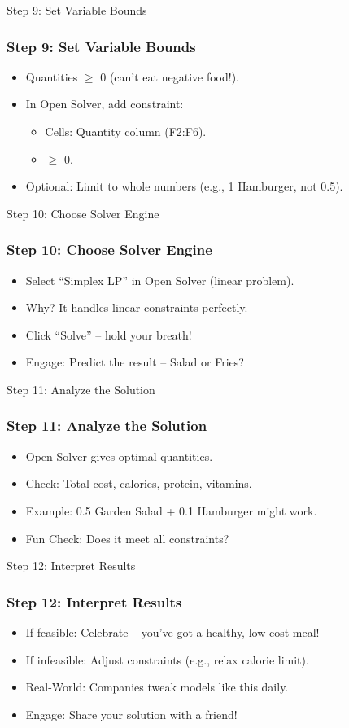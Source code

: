 \documentclass{beamer}
\begin{document}
\begin{frame}{Step 9: Set Variable Bounds}
\frametitle{Step 9: Set Variable Bounds}
\begin{itemize}
  \item Quantities \(\geq\) 0 (can’t eat negative food!).
  \item In Open Solver, add constraint:
    \begin{itemize}
      \item Cells: Quantity column (F2:F6).
      \item \(\geq\) 0.
    \end{itemize}
  \item Optional: Limit to whole numbers (e.g., 1 Hamburger, not 0.5).
\end{itemize}
\end{frame}

\begin{frame}{Step 10: Choose Solver Engine}
\frametitle{Step 10: Choose Solver Engine}
\begin{itemize}
  \item Select ``Simplex LP'' in Open Solver (linear problem).
  \item Why? It handles linear constraints perfectly.
  \item Click ``Solve'' – hold your breath!
  \item Engage: Predict the result – Salad or Fries?
\end{itemize}
\end{frame}

\begin{frame}{Step 11: Analyze the Solution}
\frametitle{Step 11: Analyze the Solution}
\begin{itemize}
  \item Open Solver gives optimal quantities.
  \item Check: Total cost, calories, protein, vitamins.
  \item Example: 0.5 Garden Salad + 0.1 Hamburger might work.
  \item Fun Check: Does it meet all constraints?
\end{itemize}
\end{frame}

\begin{frame}{Step 12: Interpret Results}
\frametitle{Step 12: Interpret Results}
\begin{itemize}
  \item If feasible: Celebrate – you’ve got a healthy, low-cost meal!
  \item If infeasible: Adjust constraints (e.g., relax calorie limit).
  \item Real-World: Companies tweak models like this daily.
  \item Engage: Share your solution with a friend!
\end{itemize}
\end{frame}
\end{document}
